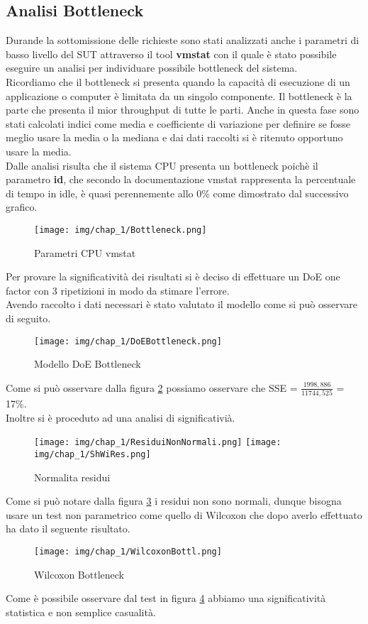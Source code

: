 \subsection{Analisi Bottleneck}
Durande la sottomissione delle richieste sono stati analizzati anche i parametri di basso livello del SUT attraverso il tool \textbf{vmstat} con il quale è stato possibile eseguire un analisi per individuare possibile bottleneck del sistema.\\
Ricordiamo che il bottleneck si presenta quando la capacità di esecuzione di un applicazione o computer è limitata da un singolo componente. Il bottleneck è la parte che presenta il mior throughput di tutte le parti. 
Anche in questa fase sono stati calcolati indici come media e coefficiente di variazione per definire se fosse meglio usare la media o la mediana e dai dati raccolti si è ritenuto opportuno usare la media.\\
Dalle analisi risulta che il sistema CPU presenta un bottleneck poichè il parametro \textbf{id}, che secondo la documentazione vmstat rappresenta la percentuale di tempo in idle, è quasi perennemente allo 0\% come dimostrato dal successivo grafico.
\begin{figure}[H]
    \centering
    \texttt{[image: img/chap\_1/Bottleneck.png]}
    \caption{Parametri CPU vmstat}
    \label{fig:bottleneck}
\end{figure}
\noindent
Per provare la significatività dei risultati si è deciso di effettuare un DoE one factor con 3 ripetizioni in modo da stimare l'errore.\\
Avendo raccolto i dati necessari è stato valutato il modello come si può osservare di seguito.
\begin{figure}[H]
    \centering
    \texttt{[image: img/chap\_1/DoEBottleneck.png]}
    \caption{Modello DoE Bottleneck}
    \label{fig:doeBott}
\end{figure}
\noindent
Come si può osservare dalla figura \ref{fig:doeBott} possiamo osservare che SSE = $\frac{1998,886}{11744,525}$ = 17\%.\\
Inoltre si è proceduto ad una analisi di significativià.\\
\begin{figure}[H]
    \centering
    \texttt{[image: img/chap\_1/ResiduiNonNormali.png]}
    \texttt{[image: img/chap\_1/ShWiRes.png]}
    \caption{Normalita residui}
    \label{fig:normRes}
\end{figure}
\noindent
Come si può notare dalla figura \ref{fig:normRes} i residui non sono normali, dunque bisogna usare un test non parametrico come quello di Wilcoxon che dopo averlo effettuato ha dato il seguente risultato.
\begin{figure}[H]
    \centering
    \texttt{[image: img/chap\_1/WilcoxonBottl.png]}
    \caption{Wilcoxon Bottleneck}
    \label{fig:WilcoxBottl}
\end{figure}
\noindent
Come è possibile osservare dal test in figura \ref{fig:WilcoxBottl} abbiamo una significatività statistica e non semplice casualità.
